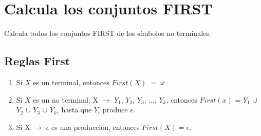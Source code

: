 \documentclass[10pt]{article}
\begin{document}
\section{Calcula los conjuntos FIRST}
Calcula todos los conjuntos FIRST de los símbolos no terminales.

\subsection{Reglas First}
\begin{enumerate}
    \item Si $X$ es un terminal, entonces $First(X)$ $=$ ${x}$
    \item Si $X$ es un no terminal, X $\rightarrow$ $Y_{1}$, $Y_{2}$, $Y_{3}$, ..., $Y_{k}$, entonces $First(x)$ = $Y_{1}$ $\cup$ $Y_{2}$ $\cup$ $Y_{3}$ $\cup$ $Y_{k}$, hasta que $Y_{i}$ produce $\epsilon$.
    \item Si X $\rightarrow$ $\epsilon$ es una producción, entonces $First(X) = \epsilon$.
\end{enumerate}
\end{document}
